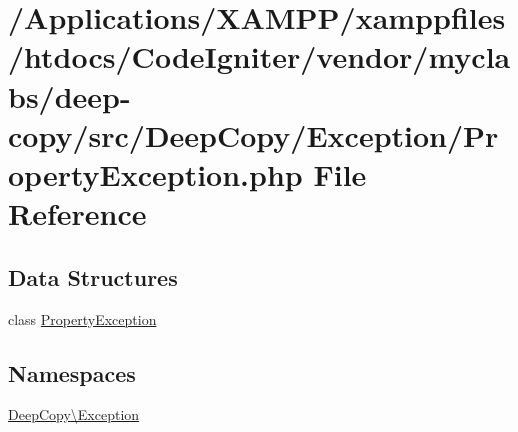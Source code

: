 \hypertarget{_property_exception_8php}{}\section{/\+Applications/\+X\+A\+M\+P\+P/xamppfiles/htdocs/\+Code\+Igniter/vendor/myclabs/deep-\/copy/src/\+Deep\+Copy/\+Exception/\+Property\+Exception.php File Reference}
\label{_property_exception_8php}
\subsection*{Data Structures}
\begin{DoxyCompactItemize}
\item 
class \mbox{\hyperlink{class_deep_copy_1_1_exception_1_1_property_exception}{Property\+Exception}}
\end{DoxyCompactItemize}
\subsection*{Namespaces}
\begin{DoxyCompactItemize}
\item 
 \mbox{\hyperlink{namespace_deep_copy_1_1_exception}{Deep\+Copy\textbackslash{}\+Exception}}
\end{DoxyCompactItemize}
